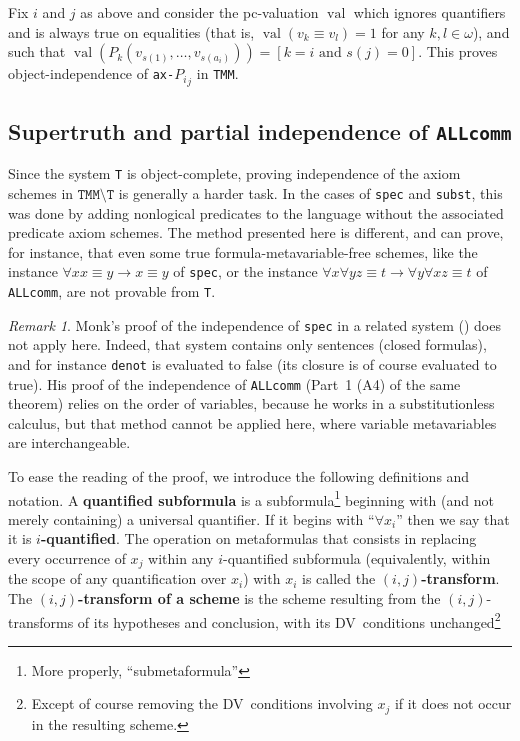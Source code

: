 \documentclass[11pt]{article}
\newcommand*{\define}[1]{\textbf{#1}}%
\DeclareMathOperator{\val}{val}
\theoremstyle{plain}
\theoremstyle{definition}
\theoremstyle{remark}
\newtheorem{remark}[theorem]{Remark}
\begin{document}
Fix $i$ and $j$ as above
and consider the pc-valuation $\val$ which ignores quantifiers and is always true on equalities
(that is, $\val(v_k \equiv v_l) = 1$ for any $k, l \in \omega$), and such that
$\val(P_k(v_{s(1)}, \ldots, v_{s(a_i)})) = [k = i \text{ and } s(j) = 0]$.
This proves object-independence of \texttt{ax-${P_i}_j$} in \texttt{TMM}.



\subsection{Supertruth and partial independence of \texttt{ALLcomm}}

Since the system \texttt{T} is object-complete, proving independence of the axiom schemes in
$\texttt{TMM}\setminus\texttt{T}$ is generally a harder task.
In the cases of \texttt{spec} and \texttt{subst}, this was done by adding nonlogical predicates
to the language without the associated predicate axiom schemes.
The method presented here is different, and can prove, for instance, that even some true
formula-metavariable-free schemes, like the instance $\forall x x \equiv y \to x \equiv y$ of
\texttt{spec}, or the instance $\forall x \forall y z \equiv t \to \forall y \forall x z \equiv t$
of \texttt{ALLcomm}, are not provable from \texttt{T}.

\begin{remark}
Monk's proof of the independence of \texttt{spec} in a related system
(\cite[Thm.~12, Part~3 (A6)]{monk}) does not apply here.
Indeed, that system contains only sentences (closed formulas), and for instance \texttt{denot}
is evaluated to false (its closure is of course evaluated to true).
His proof of the independence of \texttt{ALLcomm} (Part~1 (A4) of the same theorem) relies on
the order of variables, because he works in a substitutionless calculus, but that method cannot
be applied here, where variable metavariables are interchangeable.
\end{remark}

To ease the reading of the proof, we introduce the following definitions and notation.
A \define{quantified subformula} is a subformula\footnote{More properly, ``submetaformula''}
beginning with (and not merely containing) a universal quantifier.
If it begins with ``$\forall x_i$'' then we say that it is \define{$i$-quantified}.
The operation on metaformulas that consists in replacing every occurrence of $x_j$ within any
$i$-quantified subformula (equivalently, within the scope of any quantification over $x_i$) with
$x_i$ is called the \define{$(i, j)$-transform}.
The \define{$(i, j)$-transform of a scheme} is the scheme resulting from the $(i, j)$-transforms of
its hypotheses and conclusion, with its DV~conditions unchanged\footnote{Except of course
removing the DV~conditions involving $x_j$ if it does not occur in the resulting scheme.}
\end{document}
